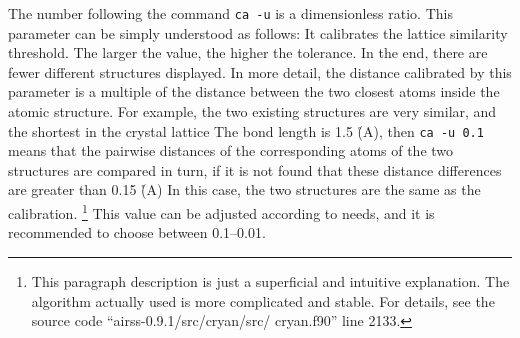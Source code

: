 \documentclass[a4paper, 10pt]{article}
\begin{document}
The number following the command \verb|ca -u| is a dimensionless ratio. This parameter can be simply understood as follows: It calibrates the lattice similarity threshold. The larger the value, the higher the tolerance. In the end, there are fewer different structures displayed. In more detail, the distance calibrated by this parameter is a multiple of the distance between the two closest atoms inside the atomic structure. For example, the two existing structures are very similar, and the shortest in the crystal lattice The bond length is 1.5 \r(A), then \verb|ca -u 0.1| means that the pairwise distances of the corresponding atoms of the two structures are compared in turn, if it is not found that these distance differences are greater than 0.15 \r(A) In this case, the two structures are the same as the calibration. \footnote{This paragraph description is just a superficial and intuitive explanation. The algorithm actually used is more complicated and stable. For details, see the source code ``airss-0.9.1/src/cryan/src/ cryan.f90'' line 2133.} This value can be adjusted according to needs, and it is recommended to choose between 0.1--0.01.
\end{document}
